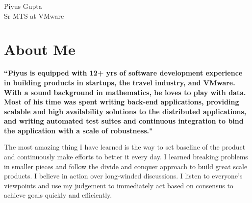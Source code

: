 \documentclass[10pt]{article} %
\begin{document}
\begin{paracol}{2} %


\parbox[top][0.12\textheight][c]{\linewidth}{ %
	\vspace{-0.04\textheight} %
	\centering %
	{\sffamily\Huge Piyus Gupta}\\\medskip %
	{\Huge\color{headings}\cvtextfont Sr MTS at VMware}
}


\section{About Me}

{\raggedright\textbf{``Piyus is equipped with 12+ yrs of software development experience in building products in startups, the travel industry, and VMware. With a sound background in mathematics, he loves to play with data. Most of his time was spent writing back-end applications, providing scalable and high availability solutions to the distributed applications, and writing automated test suites and continuous integration to bind the application with a scale of robustness."}\\\medskip}

    {The most amazing thing I have learned is the way to set baseline of the product and continuously make efforts to better it every day.}
    {I learned breaking problems in smaller pieces and follow the divide and conquer approach to build great scale products.}
    {I believe in action over long-winded discussions. I listen to everyone's viewpoints and use my judgement to immediately act based on consensus to achieve goals quickly and efficiently.}

\medskip %



\end{paracol}
\end{document}
